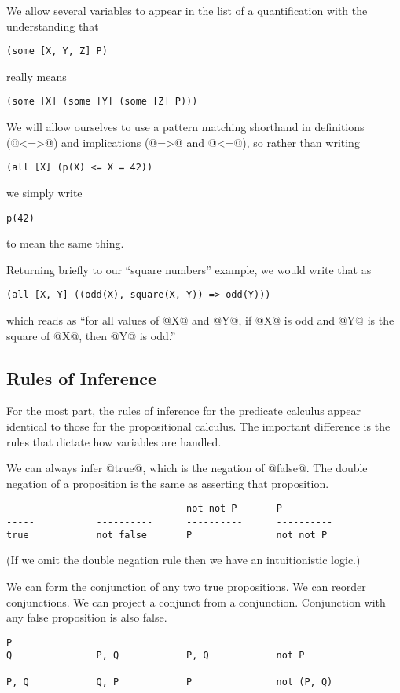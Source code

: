 We allow several variables to appear in the list of a quantification
with the understanding that
\begin{verbatim}
(some [X, Y, Z] P)
\end{verbatim}
really means
\begin{verbatim}
(some [X] (some [Y] (some [Z] P)))
\end{verbatim}

We will allow ourselves to use a pattern matching shorthand in
definitions (@<=>@) and implications (@=>@ and @<=@), so rather than
writing
\begin{verbatim}
(all [X] (p(X) <= X = 42))
\end{verbatim}
we simply write
\begin{verbatim}
p(42)
\end{verbatim}
to mean the same thing.

Returning briefly to our ``square numbers'' example, we would write that
as
\begin{verbatim}
(all [X, Y] ((odd(X), square(X, Y)) => odd(Y)))
\end{verbatim}
which reads as ``for all values of @X@ and @Y@, if @X@ is odd and @Y@ is
the square of @X@, then @Y@ is odd.''

\subsection{Rules of Inference}

For the most part, the rules of inference for the predicate calculus
appear identical to those for the propositional calculus.  The important
difference is the rules that dictate how variables are handled.

We can always infer @true@, which is the negation of @false@.
The double negation of a proposition is the same as asserting that
proposition.
\begin{verbatim}
                                not not P       P
-----           ----------      ----------      ----------
true            not false       P               not not P
\end{verbatim}
(If we omit the double negation rule then we have an intuitionistic
logic.)

We can form the conjunction of any two true propositions.
We can reorder conjunctions.
We can project a conjunct from a conjunction.
Conjunction with any false proposition is also false.
\begin{verbatim}
P
Q               P, Q            P, Q            not P
-----           -----           -----           ----------
P, Q            Q, P            P               not (P, Q)
\end{verbatim}

